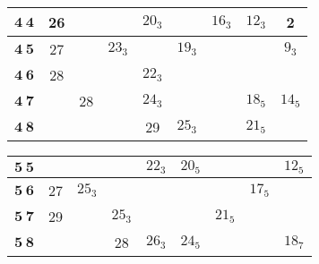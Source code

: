 \documentclass[a4paper,12pt]{report}
\begin{document}
\begin{center}
\begin{tabular}{|c||c|c|c|c|c|c|c|c|}\hline
\hspace{1.5mm} $\textbf{4}\:\textbf{4}$ \hspace{1mm} & 26 & \hspace{6mm} & \hspace{6mm} & $20_{3}$ & \hspace{6mm}
& $16_{3}$ & $12_{3}$ & 2
\\ \hline

$\textbf{4}\:\textbf{5}$ & 27 & & $23_{3}$ & \hspace{6mm} & $19_{3}$ & \hspace{6mm} & \hspace{6mm} & $9_{3}$ \\
\hline

$\textbf{4}\:\textbf{6}$ & 28 &  & & $22_{3}$ & & & & \hspace{6mm} \\ \hline

$\textbf{4}\:\textbf{7}$ & \hspace{6mm} & 28 & & $24_{3}$ &  & & $18_{5}$ & $14_{5}$ \\ \hline

$\textbf{4}\:\textbf{8}$ &  &  & & 29 & $25_{3}$ & & $21_{5}$ & \\ \hline
\end{tabular}

\begin{tabular}{|c||c|c|c|c|c|c|c|c|}\hline
\hspace{1.5mm} $\textbf{5}\:\textbf{5}$ \hspace{1mm} & \hspace{6mm} & \hspace{6mm} & \hspace{6mm} & $22_{3}$ &
$20_{5}$ & \hspace{6mm} & \hspace{6mm} & $12_{5}$
\\ \hline

$\textbf{5}\:\textbf{6}$ & 27 & $25_{3}$ & & \hspace{6mm}  & \hspace{6mm} & & $17_{5}$ & \hspace{6mm} \\ \hline

$\textbf{5}\:\textbf{7}$ & 29 &  & $25_{3}$ &  & & $21_{5}$ & & \\ \hline

$\textbf{5}\:\textbf{8}$ &  &  & 28 & $26_{3}$ & $24_{5}$ & & & $18_{7}$ \\ \hline
\end{tabular}


\end{center}
\end{document}
